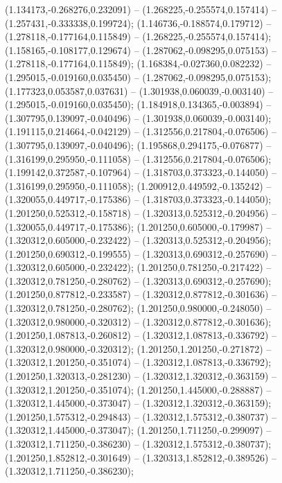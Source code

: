  (1.134173,-0.268276,0.232091) -- (1.268225,-0.255574,0.157414) -- (1.257431,-0.333338,0.199724);
 (1.146736,-0.188574,0.179712) -- (1.278118,-0.177164,0.115849) -- (1.268225,-0.255574,0.157414);
 (1.158165,-0.108177,0.129674) -- (1.287062,-0.098295,0.075153) -- (1.278118,-0.177164,0.115849);
 (1.168384,-0.027360,0.082232) -- (1.295015,-0.019160,0.035450) -- (1.287062,-0.098295,0.075153);
 (1.177323,0.053587,0.037631) -- (1.301938,0.060039,-0.003140) -- (1.295015,-0.019160,0.035450);
 (1.184918,0.134365,-0.003894) -- (1.307795,0.139097,-0.040496) -- (1.301938,0.060039,-0.003140);
 (1.191115,0.214664,-0.042129) -- (1.312556,0.217804,-0.076506) -- (1.307795,0.139097,-0.040496);
 (1.195868,0.294175,-0.076877) -- (1.316199,0.295950,-0.111058) -- (1.312556,0.217804,-0.076506);
 (1.199142,0.372587,-0.107964) -- (1.318703,0.373323,-0.144050) -- (1.316199,0.295950,-0.111058);
 (1.200912,0.449592,-0.135242) -- (1.320055,0.449717,-0.175386) -- (1.318703,0.373323,-0.144050);
 (1.201250,0.525312,-0.158718) -- (1.320313,0.525312,-0.204956) -- (1.320055,0.449717,-0.175386);
 (1.201250,0.605000,-0.179987) -- (1.320312,0.605000,-0.232422) -- (1.320313,0.525312,-0.204956);
 (1.201250,0.690312,-0.199555) -- (1.320313,0.690312,-0.257690) -- (1.320312,0.605000,-0.232422);
 (1.201250,0.781250,-0.217422) -- (1.320312,0.781250,-0.280762) -- (1.320313,0.690312,-0.257690);
 (1.201250,0.877812,-0.233587) -- (1.320312,0.877812,-0.301636) -- (1.320312,0.781250,-0.280762);
 (1.201250,0.980000,-0.248050) -- (1.320312,0.980000,-0.320312) -- (1.320312,0.877812,-0.301636);
 (1.201250,1.087813,-0.260812) -- (1.320312,1.087813,-0.336792) -- (1.320312,0.980000,-0.320312);
 (1.201250,1.201250,-0.271872) -- (1.320312,1.201250,-0.351074) -- (1.320312,1.087813,-0.336792);
 (1.201250,1.320313,-0.281230) -- (1.320312,1.320312,-0.363159) -- (1.320312,1.201250,-0.351074);
 (1.201250,1.445000,-0.288887) -- (1.320312,1.445000,-0.373047) -- (1.320312,1.320312,-0.363159);
 (1.201250,1.575312,-0.294843) -- (1.320312,1.575312,-0.380737) -- (1.320312,1.445000,-0.373047);
 (1.201250,1.711250,-0.299097) -- (1.320312,1.711250,-0.386230) -- (1.320312,1.575312,-0.380737);
 (1.201250,1.852812,-0.301649) -- (1.320313,1.852812,-0.389526) -- (1.320312,1.711250,-0.386230);
